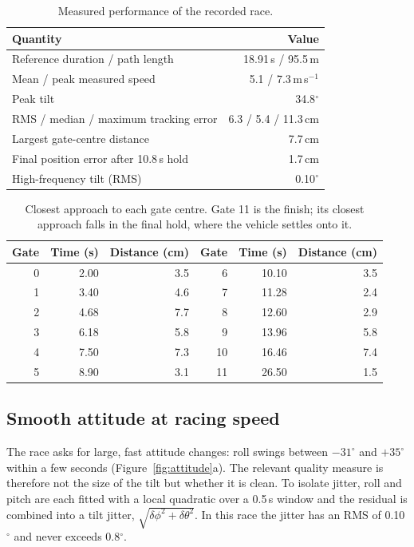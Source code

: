 \documentclass[12pt,a4paper,twoside]{article}
\begin{document}
\begin{table}[htbp]
\centering\small
\caption{Measured performance of the recorded race.}
\label{tab:metrics}
\begin{tabular}{@{}lr@{}}
\toprule
Quantity & Value\\\midrule
Reference duration / path length & 18.91\,s / 95.5\,m\\
Mean / peak measured speed & 5.1 / 7.3\,m\,s$^{-1}$\\
Peak tilt & 34.8$^\circ$\\
RMS / median / maximum tracking error & 6.3 / 5.4 / 11.3\,cm\\
Largest gate-centre distance & 7.7\,cm\\
Final position error after 10.8\,s hold & 1.7\,cm\\
High-frequency tilt (RMS) & 0.10$^\circ$\\
\bottomrule
\end{tabular}
\end{table}

\begin{table}[htbp]
\centering\small
\caption{Closest approach to each gate centre. Gate 11 is the finish; its closest
approach falls in the final hold, where the vehicle settles onto it.}
\label{tab:gates}
\begin{tabular}{@{}rrr@{\hspace{10mm}}rrr@{}}
\toprule
Gate & Time (s) & Distance (cm) & Gate & Time (s) & Distance (cm)\\\midrule
0 & 2.00 & 3.5 & 6 & 10.10 & 3.5\\
1 & 3.40 & 4.6 & 7 & 11.28 & 2.4\\
2 & 4.68 & 7.7 & 8 & 12.60 & 2.9\\
3 & 6.18 & 5.8 & 9 & 13.96 & 5.8\\
4 & 7.50 & 7.3 & 10 & 16.46 & 7.4\\
5 & 8.90 & 3.1 & 11 & 26.50 & 1.5\\\bottomrule
\end{tabular}
\end{table}

\subsection{Smooth attitude at racing speed}
The race asks for large, fast attitude changes: roll swings between $-31^\circ$
and $+35^\circ$ within a few seconds (Figure~\ref{fig:attitude}a). The relevant
quality measure is therefore not the size of the tilt but whether it is clean.
To isolate jitter, roll and pitch are each fitted with a local quadratic over a
0.5\,s window and the residual is combined into a tilt jitter,
$\sqrt{\delta\phi^2+\delta\theta^2}$. In this race the jitter has an RMS of
0.10$^\circ$ and never exceeds 0.8$^\circ$.
\end{document}

